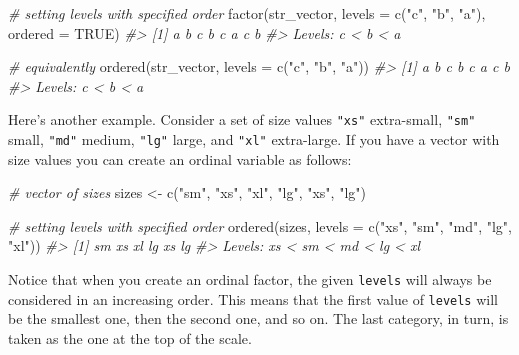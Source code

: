 \documentclass[
]{book}
\newenvironment{Shaded}{\begin{snugshade}}{\end{snugshade}}
\newcommand{\AttributeTok}[1]{\textcolor[rgb]{0.77,0.63,0.00}{#1}}
\newcommand{\CommentTok}[1]{\textcolor[rgb]{0.56,0.35,0.01}{\textit{#1}}}
\newcommand{\ConstantTok}[1]{\textcolor[rgb]{0.00,0.00,0.00}{#1}}
\newcommand{\FunctionTok}[1]{\textcolor[rgb]{0.00,0.00,0.00}{#1}}
\newcommand{\NormalTok}[1]{#1}
\newcommand{\OtherTok}[1]{\textcolor[rgb]{0.56,0.35,0.01}{#1}}
\newcommand{\StringTok}[1]{\textcolor[rgb]{0.31,0.60,0.02}{#1}}
\begin{document}
\begin{Shaded}
\begin{Highlighting}[]
\CommentTok{\# setting levels with specified order}
\FunctionTok{factor}\NormalTok{(str\_vector, }\AttributeTok{levels =} \FunctionTok{c}\NormalTok{(}\StringTok{"c"}\NormalTok{, }\StringTok{"b"}\NormalTok{, }\StringTok{"a"}\NormalTok{), }\AttributeTok{ordered =} \ConstantTok{TRUE}\NormalTok{)}
\CommentTok{\#\textgreater{} [1] a b c b c a c b}
\CommentTok{\#\textgreater{} Levels: c \textless{} b \textless{} a}

\CommentTok{\# equivalently}
\FunctionTok{ordered}\NormalTok{(str\_vector, }\AttributeTok{levels =} \FunctionTok{c}\NormalTok{(}\StringTok{"c"}\NormalTok{, }\StringTok{"b"}\NormalTok{, }\StringTok{"a"}\NormalTok{))}
\CommentTok{\#\textgreater{} [1] a b c b c a c b}
\CommentTok{\#\textgreater{} Levels: c \textless{} b \textless{} a}
\end{Highlighting}
\end{Shaded}

Here's another example. Consider a set of size values \texttt{"xs"} extra-small, \texttt{"sm"}
small, \texttt{"md"} medium, \texttt{"lg"} large, and \texttt{"xl"} extra-large. If you have a
vector with size values you can create an ordinal variable as follows:

\begin{Shaded}
\begin{Highlighting}[]
\CommentTok{\# vector of sizes}
\NormalTok{sizes }\OtherTok{\textless{}{-}} \FunctionTok{c}\NormalTok{(}\StringTok{"sm"}\NormalTok{, }\StringTok{"xs"}\NormalTok{, }\StringTok{"xl"}\NormalTok{, }\StringTok{"lg"}\NormalTok{, }\StringTok{"xs"}\NormalTok{, }\StringTok{"lg"}\NormalTok{)}

\CommentTok{\# setting levels with specified order}
\FunctionTok{ordered}\NormalTok{(sizes, }\AttributeTok{levels =} \FunctionTok{c}\NormalTok{(}\StringTok{"xs"}\NormalTok{, }\StringTok{"sm"}\NormalTok{, }\StringTok{"md"}\NormalTok{, }\StringTok{"lg"}\NormalTok{, }\StringTok{"xl"}\NormalTok{))}
\CommentTok{\#\textgreater{} [1] sm xs xl lg xs lg}
\CommentTok{\#\textgreater{} Levels: xs \textless{} sm \textless{} md \textless{} lg \textless{} xl}
\end{Highlighting}
\end{Shaded}

Notice that when you create an ordinal factor, the given \texttt{levels} will always
be considered in an increasing order. This means that the first value of \texttt{levels}
will be the smallest one, then the second one, and so on. The last category,
in turn, is taken as the one at the top of the scale.
\end{document}
